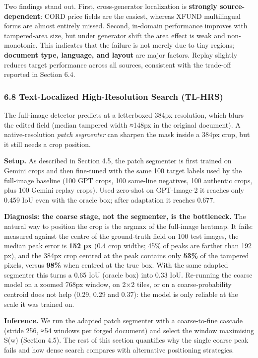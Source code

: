 Two findings stand out. First, cross-generator localization is \textbf{strongly source-dependent}: CORD price fields are the easiest, whereas XFUND multilingual forms are almost entirely missed. Second, in-domain performance improves with tampered-area size, but under generator shift the area effect is weak and non-monotonic. This indicates that the failure is not merely due to tiny regions; \textbf{document type, language, and layout} are major factors. Replay slightly reduces target performance across all sources, consistent with the trade-off reported in Section 6.4.

\subsubsection{6.8 Text-Localized High-Resolution Search (TL-HRS)}\label{text-localized-high-resolution-search-tl-hrs-1}

The full-image detector predicts at a letterboxed 384px resolution, which blurs the edited field (median tampered width ≈148px in the original document). A native-resolution \emph{patch segmenter} can sharpen the mask inside a 384px crop, but it still needs a crop position.

\textbf{Setup.} As described in Section 4.5, the patch segmenter is first trained on Gemini crops and then fine-tuned with the same 100 target labels used by the full-image baseline (100 GPT crops, 100 same-line negatives, 100 authentic crops, plus 100 Gemini replay crops). Used zero-shot on GPT-Image-2 it reaches only 0.459 IoU even with the oracle box; after adaptation it reaches 0.677.

\textbf{Diagnosis: the coarse stage, not the segmenter, is the bottleneck.} The natural way to position the crop is the argmax of the full-image heatmap. It fails: measured against the centre of the ground-truth field on 100 test images, the median peak error is \textbf{152 px} (0.4 crop widths; 45\% of peaks are farther than 192 px), and the 384px crop centred at the peak contains only \textbf{53\%} of the tampered pixels, versus \textbf{98\%} when centred at the true box. With the same adapted segmenter this turns a 0.65 IoU (oracle box) into 0.33 IoU. Re-running the coarse model on a zoomed 768px window, on 2×2 tiles, or on a coarse-probability centroid does not help (0.29, 0.29 and 0.37): the model is only reliable at the scale it was trained on.

\textbf{Inference.} We run the adapted patch segmenter with a coarse-to-fine cascade (stride 256, ≈54 windows per forged document) and select the window maximising S(w) (Section 4.5). The rest of this section quantifies why the single coarse peak fails and how dense search compares with alternative positioning strategies.

